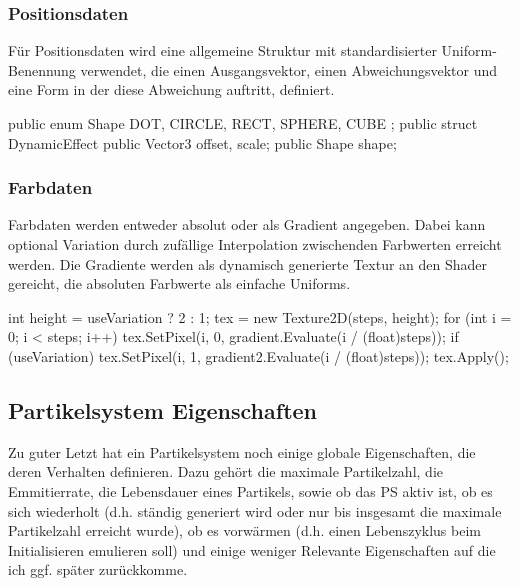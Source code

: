 \subsubsection{Positionsdaten}

Für Positionsdaten wird eine allgemeine Struktur mit standardisierter Uniform-Benennung verwendet, die einen Ausgangsvektor, einen Abweichungsvektor und eine Form in der diese Abweichung auftritt, definiert.

\begin{csh}[caption=DynamicEffect Struktur]
public enum Shape { DOT, CIRCLE, RECT, SPHERE, CUBE };
public struct DynamicEffect
{
    public Vector3 offset, scale;
    public Shape shape;
}
\end{csh}



\subsubsection{Farbdaten}

Farbdaten werden entweder absolut oder als Gradient angegeben. Dabei kann optional Variation durch zufällige Interpolation zwischenden Farbwerten erreicht werden. Die Gradiente werden als dynamisch generierte Textur an den Shader gereicht, die absoluten Farbwerte als einfache Uniforms.

\begin{csh}[caption=Generierung der Gradient-Textur]
int height = useVariation ? 2 : 1;
tex = new Texture2D(steps, height);
for (int i = 0; i < steps; i++)
{
    tex.SetPixel(i, 0, gradient.Evaluate(i / (float)steps));
    if (useVariation) tex.SetPixel(i, 1, gradient2.Evaluate(i / (float)steps));
}
tex.Apply();
\end{csh}



\subsection{Partikelsystem Eigenschaften}

Zu guter Letzt hat ein Partikelsystem noch einige globale Eigenschaften, die deren Verhalten definieren. Dazu gehört die maximale Partikelzahl, die Emmitierrate, die Lebensdauer eines Partikels, sowie ob das PS aktiv ist, ob es sich wiederholt (d.h. ständig generiert wird oder nur bis insgesamt die maximale Partikelzahl erreicht wurde), ob es vorwärmen (d.h. einen Lebenszyklus beim Initialisieren emulieren soll) und einige weniger Relevante Eigenschaften auf die ich ggf. später zurückkomme.

